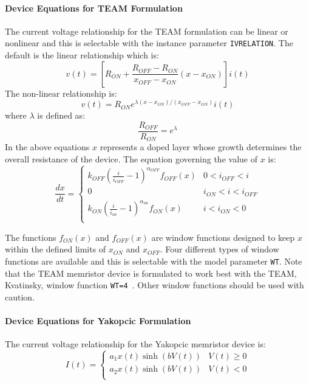 \paragraph{Device Equations for TEAM Formulation}
The current voltage relationship for the TEAM formulation can be linear or nonlinear and this is selectable with 
the instance parameter {\tt IVRELATION}.  The default is the linear relationship which is:
\begin{equation}
v(t) = \left[ R_{ON} + \frac{R_{OFF} - R_{ON}}{x_{OFF} - x_{ON}} \left( x - x_{ON} \right) \right] i(t)
\end{equation}
The non-linear relationship is:
\begin{equation}
v(t) = R_{ON} e^{\lambda(x - x_{ON})/(x_{OFF}-x_{ON})}  i(t)
\end{equation}
where $\lambda$ is defined as:
\begin{equation}
\frac{R_{OFF}}{R_{ON}} = e^{\lambda}
\end{equation}
In the above equations $x$ represents a doped layer whose growth determines the overall
resistance of the device.  The equation governing the value of $x$ is:
\begin{equation}
\frac{dx}{dt} = \left\{  
  \begin{array}{ll}
    k_{OFF} \left(\frac{i}{i_{OFF}} - 1 \right)^{\alpha_{OFF}} f_{OFF}(x) & 0 < i_{OFF} < i \\
    0       & i_{ON} < i < i_{OFF} \\
    k_{ON} \left(\frac{i}{i_{on}} - 1 \right)^{\alpha_{on}} f_{ON}(x) & i < i_{ON} < 0 \\
  \end{array}
  \right.
\end{equation}

The functions $f_{ON}(x)$ and $f_{OFF}(x)$ are window functions designed to keep $x$ within
the defined limits of $x_{ON}$ and $x_{OFF}$.  Four different types of window functions 
are available and this is selectable with the model parameter {\tt WT}. Note that the 
TEAM memristor device is formulated to work best with the TEAM, Kvatinsky, window 
function {\tt WT=4 }.  Other window functions should be used with caution.

\paragraph{Device Equations for Yakopcic Formulation}
The current voltage relationship for the Yakopcic memristor device is:~\cite{ChrisYakopcic2013}
\begin{equation}
I(t) = \left\{  
  \begin{array}{ll}
    a_1 x(t) \sinh(b V(t)) & V(t) \ge 0 \\
    a_2 x(t) \sinh(b V(t)) & V(t) < 0 \\
  \end{array}
  \right.
\end{equation}

